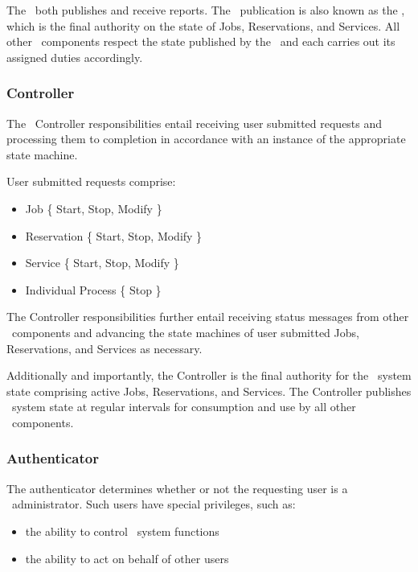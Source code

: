     The \varOrchestrator~both publishes and receive reports.  
    The \varOrchestrator~publication is also known as the \varORmap, which is
    the final authority on the state of Jobs, Reservations, and Services.
    All other \varDUCC~components respect the state published by the 
    \varOrchestrator~and each carries out its assigned duties accordingly.
    
    \subsubsection{Controller} 
    \label{Controller}
    
    The \varOrchestrator~Controller responsibilities entail receiving user 
    submitted requests and processing them to completion in accordance with 
    an instance of the appropriate state machine. 
    
    User submitted requests comprise:
    
    \begin{itemize}
      \item Job \{ Start, Stop, Modify \}
      \item Reservation \{ Start, Stop, Modify \}
      \item Service \{ Start, Stop, Modify \}
      \item Individual Process \{ Stop \}
    \end{itemize} 
    
    The Controller responsibilities further entail receiving status messages
    from other \varDUCC~components and advancing the state machines of user 
    submitted Jobs, Reservations, and Services as necessary. 
    
    Additionally and importantly, the Controller is the final authority
    for the \varDUCC~system state comprising active Jobs, Reservations, and 
    Services. The Controller publishes \varDUCC~system state at regular intervals
    for consumption and use by all other \varDUCC~components.
    
    \subsubsection{Authenticator} 
    
    The authenticator determines whether or not the requesting user is a
    \varDUCC~administrator. Such users have special privileges, such as:
    
    \begin{itemize}
      \item the ability to control \varDUCC~system functions
      \item the ability to act on behalf of other users
    \end{itemize}     
    
